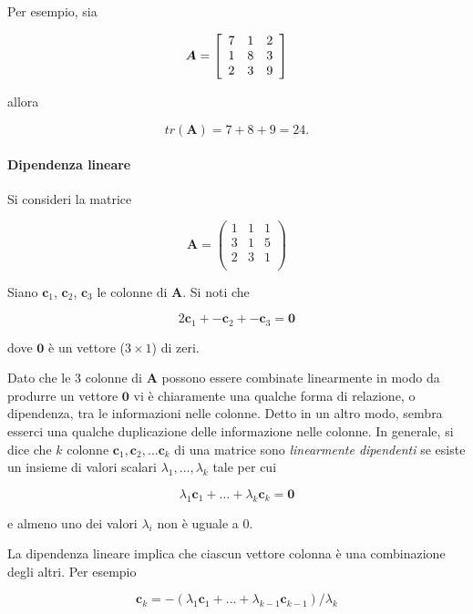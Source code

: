 \documentclass[
  11pt,
]{krantz}
\theoremstyle{definition}
\theoremstyle{definition}
\theoremstyle{definition}
\theoremstyle{definition}
\theoremstyle{remark}
\begin{document}
Per esempio, sia

\[\boldsymbol{A} =  \left[ \begin{array}{c c c}
7 & 1 & 2\\
1 & 8 & 3\\
2 & 3 & 9 \end{array} \right]\]

allora

\[tr(\boldsymbol{A}) = 7 + 8 + 9 = 24.\]

\hypertarget{dipendenza-lineare}{%
\paragraph{Dipendenza lineare}\label{dipendenza-lineare}}

Si consideri la matrice

\[\boldsymbol{A}=
\left(%
\begin{array}{ccc}
  1 & 1 & 1 \\
  3 & 1 & 5 \\
  2 & 3 & 1 \\
\end{array}%
\right)\]

Siano \(\boldsymbol{c}_1\), \(\boldsymbol{c}_2\), \(\boldsymbol{c}_3\) le colonne di \(\boldsymbol{A}\). Si noti che

\[2\boldsymbol{c}_1 + -\boldsymbol{c}_2 + - \boldsymbol{c}_3 =
\boldsymbol{0}\]

dove \(\boldsymbol{0}\) è un vettore (\(3 \times 1\)) di zeri.

Dato che le 3 colonne di \(\boldsymbol{A}\) possono essere combinate linearmente in modo da produrre un vettore \(\boldsymbol{0}\) vi è chiaramente una qualche forma di relazione, o dipendenza, tra le informazioni nelle colonne. Detto in un altro modo, sembra esserci una qualche duplicazione delle informazione nelle colonne. In generale, si dice che \(k\) colonne \(\boldsymbol{c}_1, \boldsymbol{c}_2, \dots \boldsymbol{c}_k\) di una matrice sono \emph{linearmente dipendenti} se esiste un insieme di valori scalari \(\lambda_1, \dots, \lambda_k\) tale per cui

\[\lambda_1 \boldsymbol{c}_1 + \dots + \lambda_k \boldsymbol{c}_k=\boldsymbol{0}\]

e almeno uno dei valori \(\lambda_i\) non è uguale a 0.

La dipendenza lineare implica che ciascun vettore colonna è una combinazione degli altri. Per esempio

\[\boldsymbol{c}_k= -(\lambda_1 \boldsymbol{c}_1 + \dots + \lambda_{k-1}
   \boldsymbol{c}_{k-1})/\lambda_k\]
\end{document}

